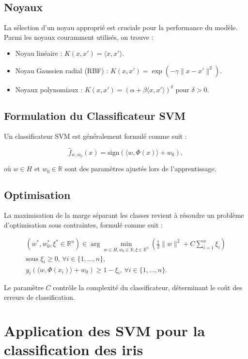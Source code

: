 \documentclass{article}
\begin{document}
\subsection{Noyaux}
La sélection d'un noyau approprié est cruciale pour la performance du
modèle. Parmi les noyaux couramment utilisés, on trouve :

\begin{itemize}
    \item Noyau linéaire : $K(x, x') = \langle x, x' \rangle$.
    \item Noyau Gaussien radial (RBF) : $K(x, x') = \exp(-\gamma \|x - x'\|^2)$.
    \item Noyaux polynomiaux : $K(x, x') = (\alpha + \beta \langle x, x' \rangle)^\delta$ pour $\delta > 0$.
\end{itemize}

\subsection{Formulation du Classificateur SVM}
Un classificateur SVM est généralement formulé comme suit :

\[
\hat{f}_{w, w_0}(x) = \text{sign}(\langle w, \Phi(x) \rangle + w_0),
\]

où $w \in H$ et $w_0 \in \mathbb{R}$ sont des paramètres ajustés lors de l'apprentissage. 

\subsection{Optimisation}
La maximisation de la marge séparant les classes revient à résoudre un 
problème d'optimisation sous contraintes, formulé comme suit :

\[
\begin{aligned}
    (w^*, w_0^*, \xi^* \in \mathbb{R}^n) \in \arg\min_{w \in H, w_0 \in \mathbb{R}, \xi \in \mathbb{R}^n} \left( \frac{1}{2} \|w\|^2 + C \sum_{i=1}^{n} \xi_i \right) \\
    \text{sous } \xi_i \geq 0, \, \forall i \in \{1, \ldots, n\}, \\
    y_i (\langle w, \Phi(x_i) \rangle + w_0) \geq 1 - \xi_i, \, \forall i \in \{1, \ldots, n\}.
\end{aligned}
\]

Le paramètre $C$ contrôle la complexité du classificateur, déterminant le 
coût des erreurs de classification.
\newpage


\section{Application des SVM pour la classification des iris}
\end{document}
